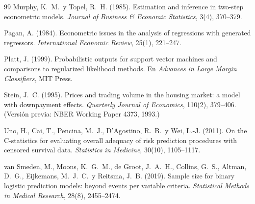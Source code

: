 \documentclass[11pt,a4paper]{article}
\theoremstyle{definition}
\begin{document}
\begin{thebibliography}{99}
Murphy, K.\ M.\ y Topel, R.\ H. (1985).
Estimation and inference in two-step econometric models.
\emph{Journal of Business \& Economic Statistics}, 3(4), 370--379.

Pagan, A. (1984).
Econometric issues in the analysis of regressions with generated regressors.
\emph{International Economic Review}, 25(1), 221--247.

Platt, J. (1999).
Probabilistic outputs for support vector machines and comparisons to regularized
likelihood methods. En \emph{Advances in Large Margin Classifiers}, MIT Press.

Stein, J.\ C. (1995).
Prices and trading volume in the housing market: a model with downpayment effects.
\emph{Quarterly Journal of Economics}, 110(2), 379--406.
(Versión previa: NBER Working Paper 4373, 1993.)

Uno, H., Cai, T., Pencina, M.\ J., D'Agostino, R.\ B.\ y Wei, L.-J. (2011).
On the C-statistics for evaluating overall adequacy of risk prediction procedures
with censored survival data.
\emph{Statistics in Medicine}, 30(10), 1105--1117.

van Smeden, M., Moons, K.\ G.\ M., de Groot, J.\ A.\ H., Collins, G.\ S.,
Altman, D.\ G., Eijkemans, M.\ J.\ C.\ y Reitsma, J.\ B. (2019).
Sample size for binary logistic prediction models: beyond events per variable
criteria.
\emph{Statistical Methods in Medical Research}, 28(8), 2455--2474.

\end{thebibliography}
\end{document}
